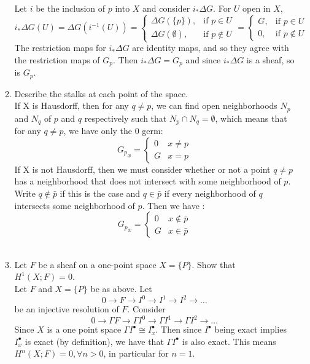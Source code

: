 \documentclass{article}
\begin{document}
\begin{enumerate}
\begin{enumerate}
Let $i$ be the inclusion of $p$ into $X$ and consider $i_*\Delta G$. For $U$ open in $X$, \[i_*\Delta G (U) = \Delta G (i^{-1} (U)) = \begin{cases} \Delta G(\{p\}), & \text{if }p \in U \\\Delta G(\emptyset), & \text{if }p \notin U  \end{cases} = \begin{cases} G, & \text{if } p \in U \\0, & \text{if }p \notin U \end{cases}\]
The restriction maps for $i_*\Delta G$ are identity maps, and so they agree with the restriction maps of $G_p$. Then  $i_*\Delta G = G_p$ and since $i_*\Delta G$ is a sheaf, so is $G_p$.\\

\item Describe the stalks at each point of the space.\\

If X is Hausdorff, then for any $q \neq p$, we can find open neighborhoods $N_p$ and $N_q$ of $p$ and $q$ respectively such that $N_p \cap N_q =\emptyset$, which means that for any $q \neq p$, we have only the 0 germ:
\[{G_p}_x = 
\begin{cases}
0 & x \neq p \\
G & x = p
\end{cases}
\]
If X is not Hausdorff, then we must consider whether or not a point $q \neq p$ has a neighborhood that does not intersect with some neighborhood of $p$. Write $q \notin \bar{p}$ if this is the case and  $q \in \bar{p}$ if every neighborhood of $q$ intersects some neighborhood of $p$. Then we have :
\[{G_p}_x = 
\begin{cases}
0 & x \notin \bar{p} \\
G & x \in \bar{p}
\end{cases}
\]\\
 
\item Let $F$ be a sheaf on a one-point space $X=\{P\}$. Show that $H^1(X;F)=0$.\\

Let $F$ and $X=\{P\}$ be as above. Let \[0 \rightarrow F \rightarrow I^0 \rightarrow I^1 \rightarrow I^2 \rightarrow \ldots\] be an injective resolution of $F$. Consider 
\[0 \rightarrow \Gamma F \rightarrow \Gamma I^0 \rightarrow \Gamma I^1 \rightarrow \Gamma I^2 \rightarrow \ldots\]
Since $X$ is a one point space $\Gamma I^\bullet \cong I^\bullet_x$. Then since $I^\bullet$ being exact implies $I^\bullet_x$ is exact (by definition), we have that $\Gamma I^\bullet$ is also exact. This means $H^n(X; F)=0, \forall n >0$, in particular for $n=1$.\\
 

\end{enumerate}
\end{enumerate}
\end{document}
